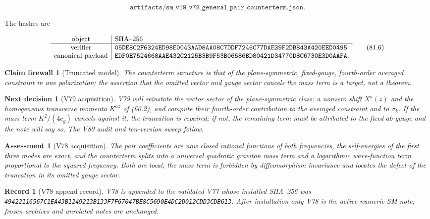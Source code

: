 \documentclass[11pt]{article}
\newtheorem{firewall}[theorem]{Claim firewall}
\newtheorem{decision}[theorem]{Next decision}
\newtheorem{assessment}[theorem]{Assessment}
\newtheorem{record}[theorem]{Record}
\theoremstyle{remark}
\begin{document}
\[
 \texttt{artifacts/sm\_v19\_v78\_general\_pair\_counterterm.json}.   \tag{81.5}
\]

The hashes are

\[
\begin{array}{c|l}
\hbox{object}&\hbox{SHA--256}\\ \hline
\hbox{verifier}&
\texttt{05DE8C2F6324ED98E0043AAD8AA08C7DDF7246C77DAE39F2DB843A420EED0495}\\
\hbox{canonical payload}&
\texttt{EDF0E7524668AAE432C2125B3B9F53B06586BD80421D34770D8C6730E3D0AAFA}.
\end{array}                                                     \tag{81.6}
\]

\begin{firewall}[Truncated model]
\label{fire:v19v78}
The counterterm structure is that of the plane-symmetric, fixed-gauge,
fourth-order averaged constraint in one polarization; the assertion
that the omitted vector and gauge sector cancels the mass term is a
target, not a theorem.
\end{firewall}

\begin{decision}[V79 acquisition]
\label{dec:v19v78-next}
V79 will reinstate the vector sector of the plane-symmetric class: a
nonzero shift \(X^a(z)\) and the homogeneous transverse momenta
\(K^{az}\) of (60.2), and compute their fourth-order contribution to
the averaged constraint and to \(\sigma_k\).  If the mass term
\(K^2/(4c_g)\) cancels against it, the truncation is repaired; if not,
the remaining term must be attributed to the fixed \(ab\)-gauge and
the note will say so.  The V80 audit and ten-version sweep follow.
\end{decision}

\begin{assessment}[V78 acquisition]
\label{ass:v19v78}
The pair coefficients are now closed rational functions of both
frequencies, the self-energies of the first three modes are exact,
and the counterterm splits into a universal quadratic graviton mass
term and a logarithmic wave-function term proportional to the squared
frequency.  Both are local; the mass term is forbidden by
diffeomorphism invariance and locates the defect of the truncation in
its omitted gauge sector.
\end{assessment}

\begin{record}[V78 append record]
\label{rec:v19v78}
V78 is appended to the validated V77 whose installed SHA--256 was
\texttt{49422116567C1EA43B1249213B133F7F67047BE8C5690E4DC2D012CDD3CDB613}.
After installation only V78 is the active numeric SM note; frozen
archives and unrelated notes are unchanged.
\end{record}
\end{document}
